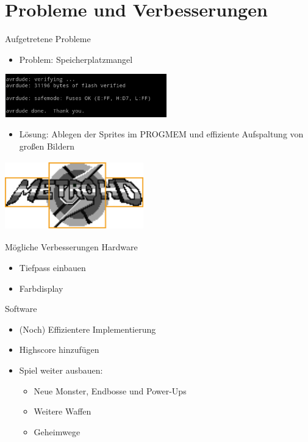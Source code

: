 \documentclass[fleqn]{beamer}
\begin{document}
\section{Probleme und Verbesserungen}
    \begin{frame}{Aufgetretene Probleme}
        \begin{itemize}
            \item Problem: Speicherplatzmangel
        \end{itemize}
        \begin{center}
            \includegraphics[width=7cm]{Bilder/speicherplatz.png}
        \end{center}
        \begin{itemize}
            \item Lösung: Ablegen der Sprites im PROGMEM und
            effiziente Aufspaltung von großen Bildern
        \end{itemize}
        \begin{center}
           \includegraphics[width=6cm, height=3cm]{Bilder/splashspeicher.png}
        \end{center}
    \end{frame}


    \begin{frame}{Mögliche Verbesserungen}
    Hardware
    		\begin{itemize}
    		\item Tiefpass einbauen
    		\item Farbdisplay
    		\end{itemize}
    		
    Software
        \begin{itemize}
        		\item (Noch) Effizientere Implementierung 
            \item Highscore hinzufügen
            \item Spiel weiter ausbauen:
                \begin{itemize}
                    \item Neue Monster, Endbosse und Power-Ups
                    \item Weitere Waffen
                    \item Geheimwege
                \end{itemize}
            
        \end{itemize}
    \end{frame}
    
\end{document}
